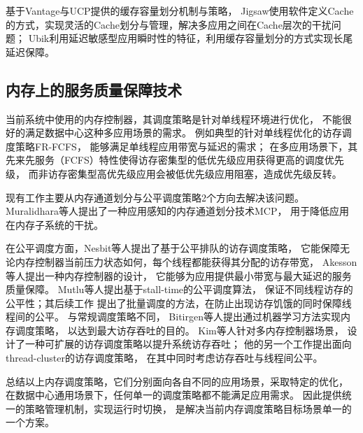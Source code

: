 基于Vantage与UCP提供的缓存容量划分机制与策略，
Jigsaw\cite{Jigsaw:2013}使用软件定义Cache的方式，实现灵活的Cache划分与管理，解决多应用之间在Cache层次的干扰问题；
Ubik\cite{kasture_ubik:_2014}利用延迟敏感型应用瞬时性的特征，利用缓存容量划分的方式实现长尾延迟保障。


\subsection{内存上的服务质量保障技术}

当前系统中使用的内存控制器，其调度策略是针对单线程环境进行优化，
不能很好的满足数据中心这种多应用场景的需求。
例如典型的针对单线程优化的访存调度策略FR-FCFS，
能够满足单线程应用带宽与延迟的需求；
在多应用场景下，其先来先服务（FCFS）特性使得访存密集型的低优先级应用获得更高的调度优先级，
而非访存密集型高优先级应用会被低优先级应用阻塞，造成优先级反转。

现有工作主要从内存通道划分与公平调度策略2个方向去解决该问题。
Muralidhara等人提出了一种应用感知的内存通道划分技术MCP\cite{muralidhara_reducing_2011}，
用于降低应用在内存子系统的干扰。

在公平调度方面，Nesbit等人提出了基于公平排队的访存调度策略\cite{Nesbit:2006}，
它能保障无论内存控制器当前压力状态如何，每个线程都能获得其分配的访存带宽，
Akesson等人提出一种内存控制器的设计\cite{Akesson:2007}，
它能够为应用提供最小带宽与最大延迟的服务质量保障。
Mutlu等人提出基于stall-time的公平调度算法\cite{mutlu_stall-time_2007}，
保证不同线程访存的公平性；其后续工作\cite{mutlu_parallelism-aware_2008}
提出了批量调度的方法，在防止出现访存饥饿的同时保障线程间的公平。
与常规调度策略不同，
Bitirgen等人提出通过机器学习方法实现内存调度策略\cite{Bitirgen:2008}，
以达到最大访存吞吐的目的。
Kim等人针对多内存控制器场景，
设计了一种可扩展的访存调度策略以提升系统访存吞吐\cite{kim_atlas:_2010}；
他的另一个工作\cite{kim_thread_2010}提出面向thread-cluster的访存调度策略，
在其中同时考虑访存吞吐与线程间公平。

总结以上内存调度策略，它们分别面向各自不同的应用场景，采取特定的优化，
在数据中心通用场景下，任何单一的调度策略都不能满足应用需求。
因此提供统一的策略管理机制，实现运行时切换，
是解决当前内存调度策略目标场景单一的一个方案。



